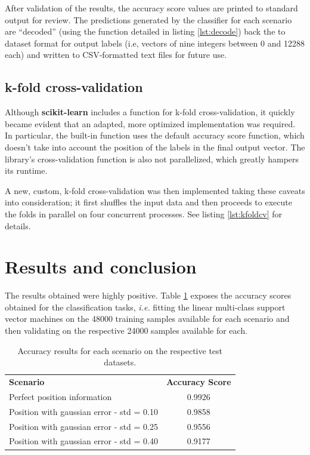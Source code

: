 \documentclass{kthreport}
\theoremstyle{definition}
\begin{document}
After validation of the results, the accuracy score values are printed to standard output for review. 
The predictions generated by the classifier for each scenario are ``decoded'' (using the function detailed in listing \ref{lst:decode}) back the to dataset format for output labels (i.e, vectors of nine integers between \num{0} and \num{12288} each) and written to CSV-formatted text files for future use.

\subsection{k-fold cross-validation}

Although \textbf{scikit-learn} includes a function for k-fold cross-validation, it quickly became evident that an adapted, more optimized implementation was required. 
In particular, the built-in function uses the default accuracy score function, which doesn't take into account the position of the labels in the final output vector. The library's cross-validation function is also not parallelized, which greatly hampers its runtime.

A new, custom, k-fold cross-validation was then implemented taking these caveats into consideration; it first shuffles the input data and then proceeds to execute the folds in parallel on four concurrent processes. See listing \ref{lst:kfoldcv} for details.


\section{Results and conclusion}

The results obtained were highly positive.
Table \ref{tbl:accuracy} exposes the accuracy scores obtained for the classification tasks, \emph{i.e.} fitting the linear multi-class support vector machines on the \num{48000} training samples available for each scenario and then validating on the respective \num{24000} samples available for each.

\begin{table}[thb]
	\centering
	\begin{tabular}{|l|c|}
		\hline 
		\textbf{Scenario} & \textbf{Accuracy Score} \\ 
		Perfect position information & \num{0.9926} \\ 
		Position with gaussian error - std = \num{0.10} & \num{0.9858} \\ 
		Position with gaussian error - std = \num{0.25} & \num{0.9556} \\ 
		Position with gaussian error - std = \num{0.40} & \num{0.9177} \\ 
		\hline 
	\end{tabular}
	\caption{Accuracy results for each scenario on the respective test datasets.}
    \label{tbl:accuracy}
\end{table}
\end{document}
